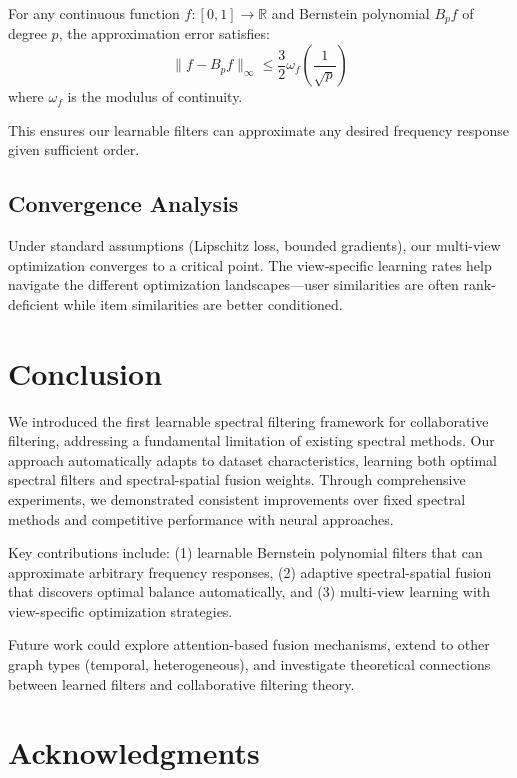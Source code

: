 \documentclass[10pt,twocolumn,letterpaper]{article}
\begin{document}
\begin{theorem}
For any continuous function $f: [0,1] \rightarrow \mathbb{R}$ and Bernstein polynomial $B_p f$ of degree $p$, the approximation error satisfies:
$$\|f - B_p f\|_\infty \leq \frac{3}{2} \omega_f\left(\frac{1}{\sqrt{p}}\right)$$
where $\omega_f$ is the modulus of continuity.
\end{theorem}

This ensures our learnable filters can approximate any desired frequency response given sufficient order.

\subsection{Convergence Analysis}

Under standard assumptions (Lipschitz loss, bounded gradients), our multi-view optimization converges to a critical point. The view-specific learning rates help navigate the different optimization landscapes—user similarities are often rank-deficient while item similarities are better conditioned.

\section{Conclusion}

We introduced the first learnable spectral filtering framework for collaborative filtering, addressing a fundamental limitation of existing spectral methods. Our approach automatically adapts to dataset characteristics, learning both optimal spectral filters and spectral-spatial fusion weights. Through comprehensive experiments, we demonstrated consistent improvements over fixed spectral methods and competitive performance with neural approaches.

Key contributions include: (1) learnable Bernstein polynomial filters that can approximate arbitrary frequency responses, (2) adaptive spectral-spatial fusion that discovers optimal balance automatically, and (3) multi-view learning with view-specific optimization strategies.

Future work could explore attention-based fusion mechanisms, extend to other graph types (temporal, heterogeneous), and investigate theoretical connections between learned filters and collaborative filtering theory.

\section{Acknowledgments}
\end{document}
